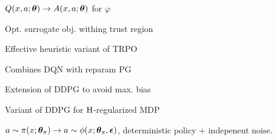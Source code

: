 \begin{definition}[A2C]
    \(Q(x, a; \vb*{\theta}) \to A(x, a; \vb*{\theta})\) for \(\varphi\)
\end{definition}

\begin{definition}[TRPO]
    Opt. surrogate obj. withing trust region
\end{definition}

\begin{definition}[PPO]
    Effective heuristic variant of TRPO
\end{definition}

\begin{definition}
    Combines DQN with reparam PG
\end{definition}

\begin{definition}[\color{H2}TD3]
    Extension of DDPG to avoid max. bias
\end{definition}

\begin{definition}
    Variant of DDPG for \(\operatorname{H}\)-regularized MDP
\end{definition}

\begin{definition}
    \(a \sim \pi(x; \vb*{\theta}_\pi) \to a \sim \phi(x; \vb*{\theta}_\pi, \vb*{\epsilon})\), deterministic policy + indepenent noise.
\end{definition}
